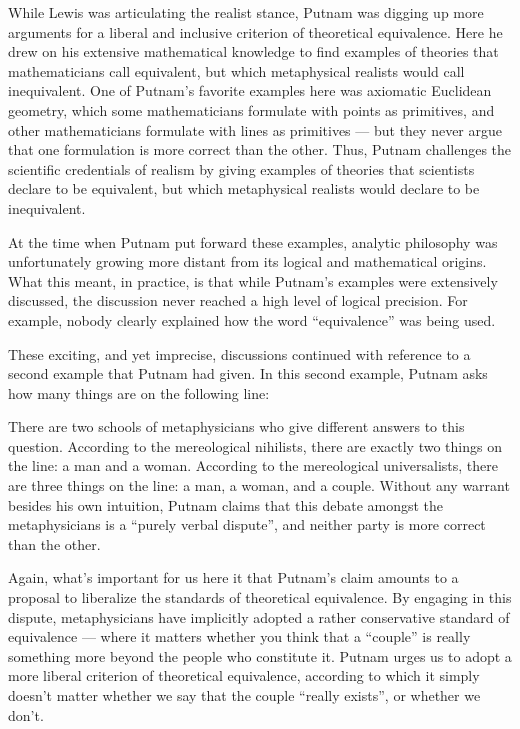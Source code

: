 While Lewis was articulating the realist stance, Putnam was digging up
more arguments for a liberal and inclusive criterion of theoretical
equivalence.  Here he drew on his extensive mathematical knowledge to
find examples of theories that mathematicians call equivalent, but
which metaphysical realists would call inequivalent.  One of Putnam's
favorite examples here was axiomatic Euclidean geometry, which some
mathematicians formulate with points as primitives, and other
mathematicians formulate with lines as primitives --- but they never
argue that one formulation is more correct than the other.  Thus,
Putnam challenges the scientific credentials of realism by giving
examples of theories that scientists declare to be equivalent, but
which metaphysical realists would declare to be inequivalent.

At the time when Putnam put forward these examples, analytic
philosophy was unfortunately growing more distant from its logical and
mathematical origins.  What this meant, in practice, is that while
Putnam's examples were extensively discussed, the discussion never
reached a high level of logical precision.  For example, nobody
clearly explained how the word ``equivalence'' was being used.

These exciting, and yet imprecise, discussions continued with
reference to a second example that Putnam had given.  In this second
example, Putnam asks how many things are on the following line:
\begin{quote} {\large \Ladiesroom \Gentsroom } \end{quote} There are
two schools of metaphysicians who give different answers to this
question.  According to the mereological nihilists, there are exactly
two things on the line: a man and a woman.  According to the
mereological universalists, there are three things on the line: a man,
a woman, and a couple.  Without any warrant besides his own intuition,
Putnam claims that this debate amongst the metaphysicians is a
``purely verbal dispute'', and neither party is more correct than the
other.

Again, what's important for us here it that Putnam's claim amounts to
a proposal to liberalize the standards of theoretical equivalence.  By
engaging in this dispute, metaphysicians have implicitly adopted a
rather conservative standard of equivalence --- where it matters
whether you think that a ``couple'' is really something more beyond
the people who constitute it.  Putnam urges us to adopt a more liberal
criterion of theoretical equivalence, according to which it simply
doesn't matter whether we say that the couple ``really exists'', or
whether we don't.


